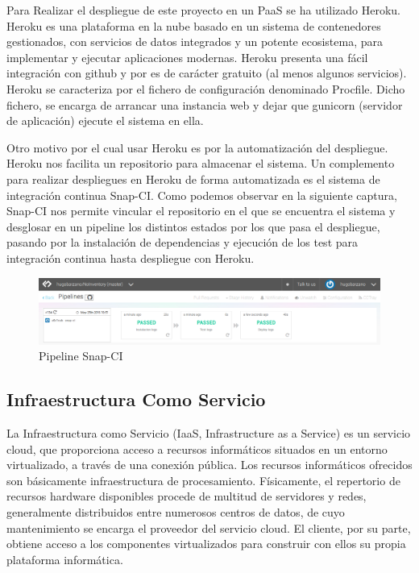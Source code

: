 \documentclass[a4paper,11pt]{book}
\begin{document}
Para Realizar el despliegue de este proyecto en un PaaS se ha utilizado Heroku\cite{hero}. Heroku es una plataforma en la nube basado en un sistema de contenedores gestionados, con servicios de datos integrados y un potente ecosistema, para implementar y ejecutar aplicaciones modernas. Heroku presenta una fácil integración con github y por es de carácter gratuito (al menos algunos servicios). Heroku se caracteriza por el fichero de configuración denominado Procfile. Dicho fichero, se encarga de arrancar una instancia web y dejar que gunicorn (servidor de aplicación) ejecute el sistema en ella.

Otro motivo por el cual usar Heroku es por la automatización del despliegue. Heroku nos facilita un repositorio para almacenar el sistema. Un complemento para realizar despliegues en Heroku de forma automatizada es el sistema de integración continua Snap-CI\cite{snap}.  Como podemos observar en la siguiente captura, Snap-CI nos permite vincular el repositorio en el que se encuentra el sistema y desglosar en un pipeline los distintos estados por los que pasa el despliegue, pasando por la instalación de dependencias y ejecución de los test para integración continua hasta despliegue con Heroku.  

\begin{figure}[h] 
\centering 
\includegraphics[scale=0.25]{imagenes/desarrollo_herramienta/snp_ci.png}
\caption{ Pipeline Snap-CI  }  
\end{figure}

\subsection{Infraestructura Como Servicio}
La Infraestructura como Servicio\cite{iaas} (IaaS, Infrastructure as a Service) es un servicio cloud, que proporciona acceso a recursos informáticos situados en un entorno virtualizado, a través de una conexión pública. Los recursos informáticos ofrecidos  son básicamente infraestructura de procesamiento. Físicamente, el repertorio de recursos hardware disponibles procede de multitud de servidores y redes, generalmente distribuidos entre numerosos centros de datos, de cuyo mantenimiento se encarga el proveedor del servicio cloud. El cliente, por su parte, obtiene acceso a los componentes virtualizados para construir con ellos su propia plataforma informática.
\end{document}
